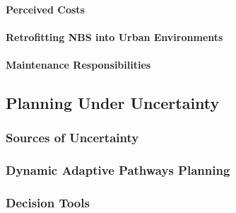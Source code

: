 \paragraph{Perceived Costs}

\paragraph{Retrofitting NBS into Urban Environments}

\paragraph{Maintenance Responsibilities}

\subsection{Planning Under Uncertainty}

\subsubsection{Sources of Uncertainty}

\subsubsection{Dynamic Adaptive Pathways Planning}

\subsubsection{Decision Tools}